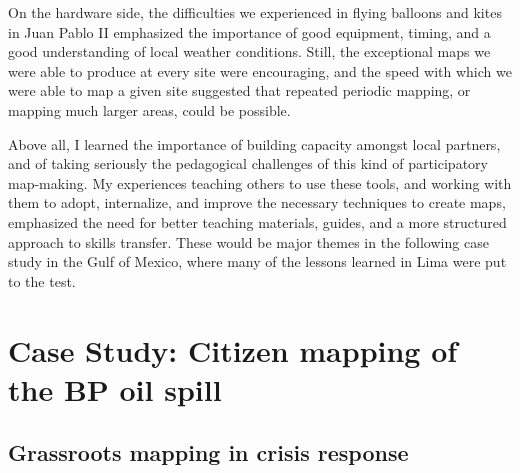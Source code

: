 \documentclass[11pt,oneside,notitlepage]{report}
\begin{document}
On the hardware side, the difficulties we experienced in flying balloons and kites in Juan Pablo II emphasized the importance of good equipment, timing, and a good understanding of local weather conditions. Still, the exceptional maps we were able to produce at every site were encouraging, and the speed with which we were able to map a given site suggested that repeated periodic mapping, or mapping much larger areas, could be possible. 

Above all, I learned the importance of building capacity amongst local partners, and of taking seriously the pedagogical challenges of this kind of participatory map-making. My experiences teaching others to use these tools, and working with them to adopt, internalize, and improve the necessary techniques to create maps, emphasized the need for better teaching materials, guides, and a more structured approach to skills transfer. These would be major themes in the following case study in the Gulf of Mexico, where many of the lessons learned in Lima were put to the test. 

\chapter{Case Study: Citizen mapping of the BP oil spill}
\label{chap:gulf}

\section{Grassroots mapping in crisis response}
\end{document}
